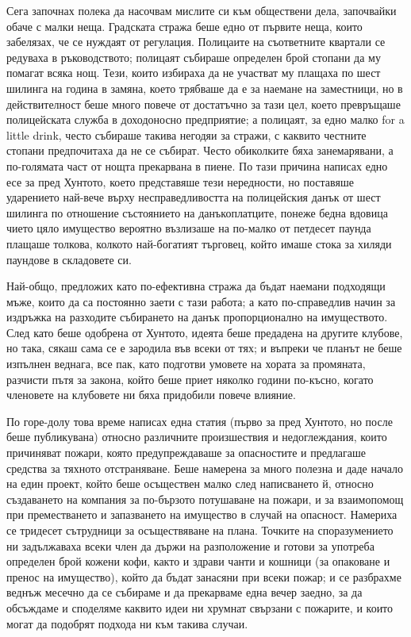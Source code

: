 \documentclass[12pt]{book}
\begin{document}
Сега започнах полека да насочвам мислите си към обществени дела, започвайки обаче с малки неща. Градската стража беше едно от първите неща, които забелязах, че се нуждаят от регулация. Полицаите на съответните квартали се редуваха в ръководството; полицаят събираше определен брой стопани да му помагат всяка нощ. Тези, които избираха да не участват му плащаха по шест шилинга на година в замяна, което трябваше да е за наемане на заместници, но в действителност беше много повече от достатъчно за тази цел, което превръщаше полицейската служба в доходоносно предприятие; а полицаят, за едно малко for a little drink, често събираше такива негодяи за стражи, с каквито честните стопани предпочитаха да не се събират. Често обиколките бяха занемарявани, а по-голямата част от нощта прекарвана в пиене. По тази причина написах едно есе за пред Хунтото, което представяше тези нередности, но поставяше ударението най-вече върху несправедливостта на полицейския данък от шест шилинга по отношение състоянието на данъкоплатците, понеже бедна вдовица чието цяло имущество вероятно възлизаше на по-малко от петдесет паунда плащаше толкова, колкото най-богатият търговец, който имаше стока за хиляди паундове в складовете си.

Най-общо, предложих като по-ефективна стража да бъдат наемани подходящи мъже, които да са постоянно заети с тази работа; а като по-справедлив начин за издръжка на разходите събирането на данък пропорционално на имуществото. След като беше одобрена от Хунтото, идеята беше предадена на другите клубове, но така, сякаш сама се е зародила във всеки от тях; и въпреки че планът не беше изпълнен веднага, все пак, като подготви умовете на хората за промяната, разчисти пътя за закона, който беше приет няколко години по-късно, когато членовете на клубовете ни бяха придобили повече влияние.

По горе-долу това време написах една статия (първо за пред Хунтото, но после беше публикувана) относно различните произшествия и недоглеждания, които причиняват пожари, която предупреждаваше за опасностите и предлагаше средства за тяхното отстраняване. Беше намерена за много полезна и даде начало на един проект, който беше осъществен малко след написването й, относно създаването на компания за по-бързото потушаване на пожари, и за взаимопомощ при преместването и запазването на имущество в случай на опасност. Намериха се тридесет сътрудници за осъществяване на плана. Точките на споразумението ни задължаваха всеки член да държи на разположение и готови за употреба определен брой кожени кофи, както и здрави чанти и кошници (за опаковане и пренос на имущество), който да бъдат занасяни при всеки пожар; и се разбрахме веднъж месечно да се събираме и да прекарваме една вечер заедно, за да обсъждаме и споделяме каквито идеи ни хрумнат свързани с пожарите, и които могат да подобрят подхода ни към такива случаи.
\end{document}

